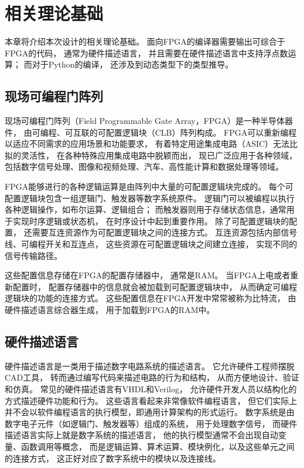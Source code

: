 \section{相关理论基础}

本章将介绍本次设计的相关理论基础。
面向FPGA的编译器需要输出可综合于FPGA的代码，
通常为硬件描述语言，
并且需要在硬件描述语言中支持浮点数运算；
而对于Python的编译，
还涉及到动态类型下的类型推导。

\subsection{现场可编程门阵列}

现场可编程门阵列（Field Programmable Gate Array，FPGA）是一种半导体器件，
由可编程、可互联的可配置逻辑块（CLB）阵列构成。
FPGA可以重新编程以适应不同需求的应用场景和功能要求，
有着特定用途集成电路（ASIC）无法比拟的灵活性，
在各种特殊应用集成电路中脱颖而出，
现已广泛应用于各种领域，
包括数字信号处理、图像和视频处理、汽车、高性能计算和数据处理等领域。

FPGA能够进行的各种逻辑运算是由阵列中大量的可配置逻辑块完成的。
每个可配置逻辑块包含一组逻辑门、触发器等数字系统原件。
逻辑门可以被编程以执行各种逻辑操作，如布尔运算、逻辑组合；
而触发器则用于存储状态信息，通常用于实现时序逻辑或状态机，
在时序设计中起到重要作用。
除了可配置逻辑块的配置，
还需要互连资源作为可配置逻辑块之间的连接方式。
互连资源包括内部信号线、可编程开关和互连点，
这些资源在可配置逻辑块之间建立连接，
实现不同的信号传输路径。

这些配置信息存储在FPGA的配置存储器中，
通常是RAM。
当FPGA上电或者重新配置时，
配置存储器中的信息就会被加载到可配置逻辑块中，
从而确定可编程逻辑块的功能的连接方式。
这些配置信息在FPGA开发中常常被称为比特流，
由硬件描述语言综合器生成，
用于加载到FPGA的RAM中。

\subsection{硬件描述语言}

硬件描述语言是一类用于描述数字电路系统的描述语言。
它允许硬件工程师摆脱CAD工具，
转而通过编写代码来描述电路的行为和结构，
从而方便地设计、验证和仿真。
常见的硬件描述语言有VHDL和Verilog，
允许硬件开发人员以结构化的方式描述硬件功能和行为。
这些语言看起来非常像软件编程语言，
但它们实际上并不会以软件编程语言的执行模型，即通用计算架构的形式运行。
数字系统是由数字电子元件（如逻辑门、触发器等）组成的系统，
用于处理数字信号，
而硬件描述语言实际上就是数字系统的描述语言，
他的执行模型通常不会出现自动变量、函数调用等概念，
而是逻辑运算、算术运算、模块例化，以及这些单元之间的连接方式，
这正好对应了数字系统中的模块以及连接线。

